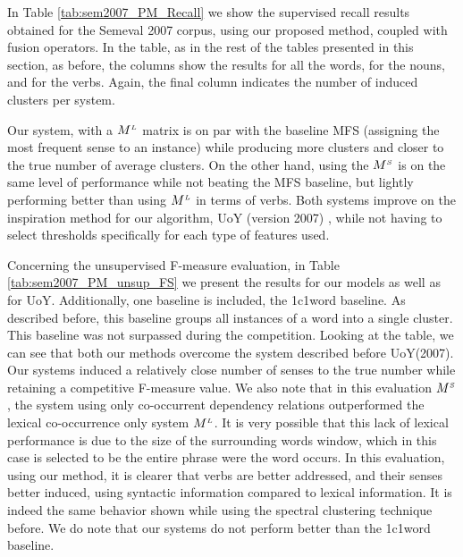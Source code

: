 In Table \ref{tab:sem2007_PM_Recall}  we show the supervised recall results obtained for the Semeval 2007 corpus, using our proposed method, coupled with fusion operators. In the table, as in the rest of the tables presented in this section, as before, the columns show the results for all the words, for the nouns, and for the verbs. Again, the final column indicates the number of induced clusters per system. 

Our system, with a  $M^{\scriptscriptstyle L}$ matrix is on par with the baseline MFS (assigning the most frequent sense to an instance) while producing more clusters and closer to the true number of average clusters. On the other hand, using the $M^{\scriptscriptstyle S}$ is on the same level of performance while not beating the MFS baseline, but lightly performing better than using $M^{\scriptscriptstyle L}$ in terms of verbs. Both systems improve on the inspiration method for our algorithm,  UoY (version 2007) \cite{2007.Klapaftis.UoY}, while not having to select thresholds specifically for each type of features used.


Concerning the unsupervised F-measure evaluation, in Table \ref{tab:sem2007_PM_unsup_FS} we present the results for our models as well as for UoY. Additionally, one baseline is included, the 1c1word baseline. As described before, this baseline  groups all instances of a word into a single cluster. This baseline was not surpassed during the competition. Looking at the table, we can see that both our methods overcome the system described before {UoY(2007)}. Our systems induced a relatively close number of senses to the true number while retaining a competitive F-measure value. We also note that in this evaluation $M^{\scriptscriptstyle S}$, the system using only co-occurrent dependency relations outperformed the lexical co-occurrence only system $M^{\scriptscriptstyle L}$. It is very possible that this lack of lexical performance is due to the size of the surrounding words window, which in this case is selected to be the entire phrase were the word occurs. In this evaluation, using our method,  it is clearer that  verbs are  better addressed, and their senses better induced, using syntactic information compared to lexical information. It is indeed the same behavior shown while using the spectral clustering technique before.  We do note that our systems do not perform better than the 1c1word baseline. 



